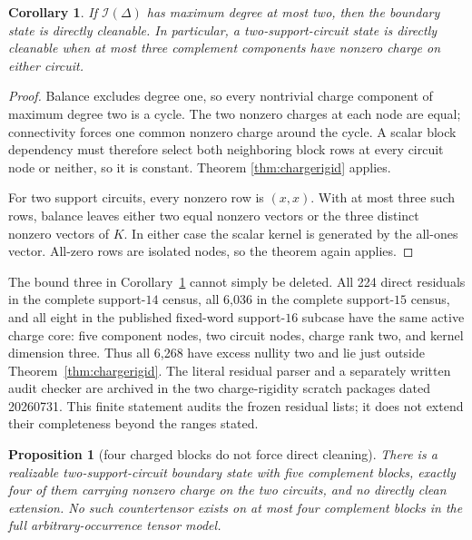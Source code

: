 \documentclass[11pt]{article}
\newtheorem{proposition}[theorem]{Proposition}
\newtheorem{corollary}[theorem]{Corollary}
\theoremstyle{definition}
\theoremstyle{remark}
\begin{document}
\begin{corollary}
\label{cor:chargecycle}
If $\mathcal I(\Delta)$ has maximum degree at most two, then the boundary
state is directly cleanable.  In particular, a two-support-circuit state
is directly cleanable when at most three complement components have
nonzero charge on either circuit.
\end{corollary}

\begin{proof}
Balance excludes degree one, so every nontrivial charge component of
maximum degree two is a cycle.  The two nonzero charges at each node are
equal; connectivity forces one common nonzero charge around the cycle.
A scalar block dependency must therefore select both neighboring block
rows at every circuit node or neither, so it is constant.  Theorem
\ref{thm:chargerigid} applies.

For two support circuits, every nonzero row is $(x,x)$.  With at most
three such rows, balance leaves either two equal nonzero vectors or the
three distinct nonzero vectors of $K$.  In either case the scalar kernel
is generated by the all-ones vector.  All-zero rows are isolated nodes,
so the theorem again applies.
\end{proof}

The bound three in Corollary~\ref{cor:chargecycle} cannot simply be
deleted.  All 224 direct residuals in the complete support-$14$ census,
all 6,036 in the complete support-$15$ census, and all eight in the
published fixed-word support-$16$ subcase have the same active charge
core: five component nodes, two circuit nodes, charge rank two, and
kernel dimension three.  Thus all 6,268 have excess nullity two and lie
just outside Theorem~\ref{thm:chargerigid}.  The literal residual parser
and a separately written audit checker are archived in the two
charge-rigidity scratch packages dated 20260731.
This finite statement audits the frozen residual lists; it does not
extend their completeness beyond the ranges stated.

\begin{proposition}[four charged blocks do not force direct cleaning]
\label{prop:four-charge-countertensor}
There is a realizable two-support-circuit boundary state with five
complement blocks, exactly four of them carrying nonzero charge on the
two circuits, and no directly clean extension.  No such countertensor
exists on at most four complement blocks in the full arbitrary-occurrence
tensor model.
\end{proposition}
\end{document}

